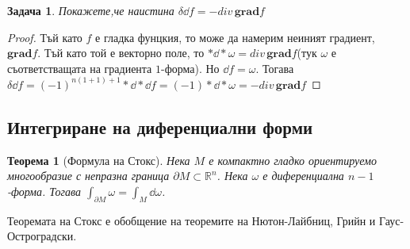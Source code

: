 \documentclass[12pt]{article}
\newtheorem{problem}{Задача}
\newtheorem*{theorem*}{Теорема}
\begin{document}
\begin{large}
\begin{problem}
Покажете,че наистина $\delta \dd f = - div \, \mathbf{grad} f$
\end{problem}

\begin{proof}
Тъй като $f$ е гладка фунцкия, то може да намерим неиният градиент, $\mathbf{grad} f$. Тъй като той е векторно поле, то $\ast \dd \ast \omega = div \, \mathbf{grad} f$(тук $\omega$ е съответстващата на градиента $1$-форма). Но $\dd f = \omega$. Тогава $\delta \dd f = (-1)^{n(1+1)+1} \ast \dd \ast \dd f = (-1) \ast \dd \ast \omega = - div \, \mathbf{grad} f$ 
\end{proof}

\subsection{Интегриране на диференциални форми}

\begin{theorem*}[Формула на Стокс]
 Нека $M$ е компактно гладко ориентируемо многообразие с непразна граница $\partial M \subset \mathbb{R}^n$. Нека $\omega$ е диференциална $n-1$-форма. Тогава $\int_{\partial M} \omega = \int_M \dd \omega$.
\end{theorem*}

Теоремата на Стокс е обобщение на теоремите на Нютон-Лайбниц, Грийн и Гаус-Остроградски.

\end{large}
\end{document}
